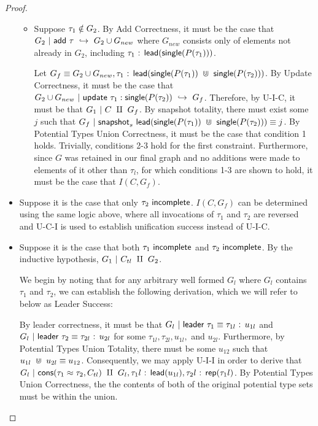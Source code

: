 \begin{proof}
\begin{itemize}
\begin{itemize}
        \item Suppose $\tau_1 \notin G_2$. By Add Correctness, it must be the case that $G_2~|~\normalfont\textsf{add}~\tau ~\hookrightarrow~ G_2 \cup G_{new}$ where $G_{new}$ consists only of elements not already in $G_2$, including $\tau_1\normalfont\textsf{ : }\normalfont\textsf{lead}(\normalfont\textsf{single}(P(\tau_1)))$. 

        Let $G_f \equiv G_2 \cup G_{new}, \tau_1\normalfont\textsf{ : }\normalfont\textsf{lead}(\normalfont\textsf{single}(P(\tau_1))~\Cup~\normalfont\textsf{single}(P(\tau_2)))$.
        By Update Correctness, it must be the case that $G_2 \cup G_{new}~|~\normalfont\textsf{update}~\tau_1:\normalfont\textsf{single}(P(\tau_2)) ~\hookrightarrow~ G_f$. Therefore, by U-I-C, it must be that $G_1~|~C~\amalg~G_f$. By snapshot totality, there must exist some $j$ such that $G_f~|~\normalfont\textsf{snapshot}_s~\normalfont\textsf{lead}(\normalfont\textsf{single}(P(\tau_1))~\Cup~\normalfont\textsf{single}(P(\tau_2))) \equiv j$. By Potential Types Union Correctness, it must be the case that condition 1 holds. Trivially, conditions 2-3 hold for the first constraint. Furthermore, since $G$ was retained in our final graph and no additions were made to elements of it other than $\tau_l$, for which conditions 1-3 are shown to hold, it must be the case that $I(C, G_f)$.
        
    \end{itemize}
    \item Suppose it is the case that only $\tau_2 ~ \normalfont\textsf{incomplete}$. $I(C, G_f)$ can be determined using the same logic above, where all invocations of $\tau_1$ and $\tau_2$ are reversed and U-C-I is used to establish unification success instead of U-I-C.
    
    \item Suppose it is the case that both $\tau_1 ~ \normalfont\textsf{incomplete}$ and $\tau_2 ~ \normalfont\textsf{incomplete}$. By the inductive hypothesis, $G_1~|~C_{tl}~\amalg~G_2$. 

    We begin by noting that for any arbitrary well formed $G_l$ where $G_l$ contains $\tau_1$ and $\tau_2$, we can establish the following derivation, which we will refer to below as Leader Success:
    
    By leader correctness, it must be that $G_l~|~\normalfont\textsf{leader}~\tau_1 \equiv \tau_{1l}\normalfont\textsf{ : }u_{1l}$ and $G_l~|~\normalfont\textsf{leader}~\tau_2 \equiv \tau_{2l}\normalfont\textsf{ : }u_{2l}$ for some $\tau_{1l}, \tau_{2l}, u_{1l},$ and $ u_{2l}$. Furthermore, by Potential Types Union Totality, there must be some $u_{12}$ such that $u_{1l}~\Cup~u_{2l} \equiv u_{12}$. Consequently, we may apply U-I-I in order to derive that $G_l~|~\normalfont\textsf{cons}({\tau_1} \approx {\tau_2}, C_{tl})~\amalg~G_l, \tau_1l\normalfont\textsf{ : }\normalfont\textsf{lead}(u_{1l}), \tau_2l\normalfont\textsf{ : }\normalfont\textsf{rep}(\tau_1l)$. By Potential Types Union Correctness, the the contents of both of the original potential type sets must be within the union. 


\end{itemize}
\end{proof}
